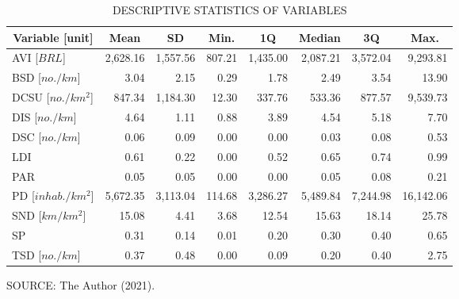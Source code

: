 \begin{table}[!htbp]
    \footnotesize
    \captionsetup{justification=raggedright,
        singlelinecheck=false,
        font=footnotesize}
    \caption{DESCRIPTIVE STATISTICS OF VARIABLES}
    \centering
    \begin{tabular}{lrrrrrrr}
        \hline
        \multicolumn{1}{c}{\textbf{Variable [unit]}} & \multicolumn{1}{c}{\textbf{Mean}} & \multicolumn{1}{c}{\textbf{SD}} & \multicolumn{1}{c}{\textbf{Min.}} & \multicolumn{1}{c}{\textbf{1Q}} & \multicolumn{1}{c}{\textbf{Median}} & \multicolumn{1}{c}{\textbf{3Q}} & \multicolumn{1}{c}{\textbf{Max.}} \\ 
        \hline
        AVI [$BRL$]& 2,628.16 & 1,557.56 & 807.21 & 1,435.00 & 2,087.21 & 3,572.04 & 9,293.81 \\ 
        BSD [$no./km$] & 3.04 & 2.15 & 0.29 & 1.78 & 2.49 & 3.54 & 13.90 \\ 
        DCSU [$no./km^2$] & 847.34 & 1,184.30 & 12.30 & 337.76 & 533.36 & 877.57 & 9,539.73 \\ 
        DIS [$no./km$] & 4.64 & 1.11 & 0.88 & 3.89 & 4.54 & 5.18 & 7.70 \\ 
        DSC [$no./km$] & 0.06 & 0.09 & 0.00 & 0.00 & 0.03 & 0.08 & 0.53 \\ 
        LDI & 0.61 & 0.22 & 0.00 & 0.52 & 0.65 & 0.74 & 0.99 \\ 
        PAR & 0.05 & 0.05 & 0.00 & 0.00 & 0.05 & 0.08 & 0.21 \\ 
        PD [$inhab./km^2$] & 5,672.35 & 3,113.04 & 114.68 & 3,286.27 & 5,489.84 & 7,244.98 & 16,142.06 \\ 
        SND [$km/km^2$] & 15.08 & 4.41 & 3.68 & 12.54 & 15.63 & 18.14 & 25.78 \\ 
        SP & 0.31 & 0.14 & 0.01 & 0.20 & 0.30 & 0.40 & 0.65 \\ 
        TSD [$no./km$] & 0.37 & 0.48 & 0.00 & 0.09 & 0.20 & 0.40 & 2.75 \\ 
        \hline
    \end{tabular}
    \label{tab:var_summary}
    \par \vspace{2mm} \footnotesize \raggedright
    SOURCE: The Author (2021).
\end{table}



